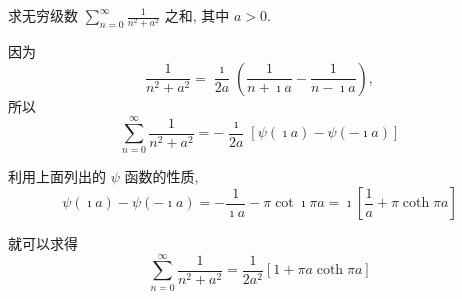 \begin{example}
求无穷级数 $\sum_{n=0}^{\infty} \frac{1}{n^{2}+a^{2}}$ 之和, 其中 $a>0$.
\end{example}
\begin{solution}
因为
$$
\frac{1}{n^{2}+a^{2}}=\frac{\imath}{2 a}\left(\frac{1}{n+\imath a}-\frac{1}{n-\imath a}\right),
$$
所以
$$
\sum_{n=0}^{\infty} \frac{1}{n^{2}+a^{2}}=-\frac{\imath}{2 a}[\psi(\imath a)-\psi(-\imath a)]
$$

利用上面列出的 $\psi$ 函数的性质,
$$
\psi(\imath a)-\psi(-\imath a)=-\frac{1}{\imath a}-\pi \cot \imath \pi a=\imath\left[\frac{1}{a}+\pi \coth \pi a\right]
$$

就可以求得
$$
\sum_{n=0}^{\infty} \frac{1}{n^{2}+a^{2}}=\frac{1}{2 a^{2}}[1+\pi a \coth \pi a]
$$
\end{solution}